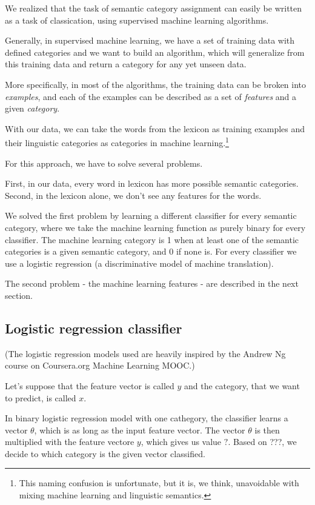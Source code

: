 We realized that the task of semantic category assignment can easily be written as a task of classication, using supervised machine learning algorithms.

Generally, in supervised machine learning, we have a set of training data with defined categories and we want to build an algorithm, which will generalize from this training data and return a category for any yet unseen data.

More specifically, in most of the algorithms, the training data can be broken into \textit{examples}, and each of the examples can be described as a set of \textit{features} and a given \textit{category}.

With our data, we can take the words from the lexicon as training examples and their linguistic categories as categories in machine learning.\footnote{This naming confusion is unfortunate, but it is, we think, unavoidable with mixing machine learning and linguistic semantics.} 

For this approach, we have to solve several problems.

First, in our data, every word in lexicon has more possible semantic categories. Second, in the lexicon alone, we don't see any features for the words.

We solved the first problem by learning a different classifier for every semantic category, where we take the machine learning function as purely binary for every classifier. The machine learning category is 1 when at least one of the semantic categories is a given semantic category, and 0 if none is. For every classifier we use a logistic regression (a discriminative model of machine translation).

The second problem - the machine learning features - are described in the next section.

\subsection{Logistic regression classifier}
(The logistic regression models used are heavily inspired by the Andrew Ng course on Coursera.org Machine Learning MOOC.)

Let's suppose that the feature vector is called $y$ and the category, that we want to predict, is called $x$.

In binary logistic regression model with one cathegory, the classifier learns a vector $\theta$, which is as long as the input feature vector. The vector $\theta$ is then multiplied with the feature vectore $y$, which gives us value $?$. Based on ???, we decide to which category is the given vector classified.

